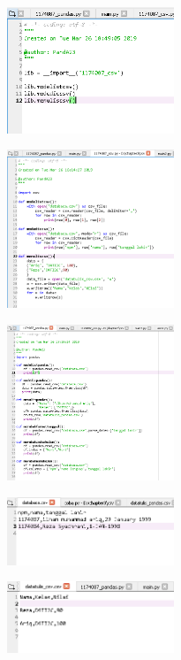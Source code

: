 \begin{figure}[H]
 \includegraphics[width=5cm]{figures/4/1174087/Praktek/main2.png}
 \centering
\end{figure}

\begin{figure}[H]
 \includegraphics[width=5cm]{figures/4/1174087/Praktek/1174087_csv.png}
 \centering
\end{figure}

\begin{figure}[H]
 \includegraphics[width=5cm]{figures/4/1174087/Praktek/1174087_pandas.png}
 \centering
\end{figure}

\begin{figure}[H]
 \includegraphics[width=5cm]{figures/4/1174087/Praktek/databaca.png}
 \centering
\end{figure}

\begin{figure}[H]
 \includegraphics[width=5cm]{figures/4/1174087/Praktek/datatulis_csv.png}
 \centering
\end{figure}

